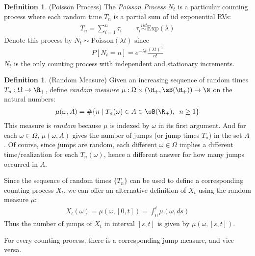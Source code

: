 \documentclass[12pt]{article}
\theoremstyle{plain}
\theoremstyle{definition}
\newtheorem{defn}[thm]{Definition}
\theoremstyle{remark}
\newcommand{\ra}{\rightarrow}
\newcommand{\iid}{\overset{iid}{\sim}}
\newcommand{\sumin}{\sum^n_{i=1}}
\begin{document}
\begin{defn}(Poisson Process)
The \emph{Poisson Process} $N_t$ is a particular counting process where
each random time $T_n$ is a partial sum of iid exponential RVs:
\begin{align*}
  T_n = \sumin \tau_i
  \qquad
  \tau_i\iid \text{Exp}(\lambda)
\end{align*}
Denote this process by $N_t\sim\text{Poisson}(\lambda t)$ since
\begin{align*}
  P[N_t=n]
  =
  e^{-\lambda t}
  \frac{(\lambda t)^n}{n!}
\end{align*}
$N_t$ is the only counting process with independent and stationary
increments.
\end{defn}

\begin{defn}(Random Measure)
Given  an increasing sequence of random times $T_n:\Omega\ra\R_+$,
define \emph{random measure} $\mu:\Omega\times(\R_+,\sB(\R_+))\ra \N$ on
the natural numbers:
\begin{align*}
  \mu(\omega,A)
  =
  \#\{
    n
    \;|\;
    T_n(\omega)\in A\in\sB(\R_+),\;\; n\geq 1
  \}
\end{align*}
This measure is \emph{random} because $\mu$ is indexed by $\omega$ in
its first argument.
And for each $\omega\in\Omega$, $\mu(\omega,A)$ gives the number of
jumps (or jump times $T_n$) in the set $A$.
Of course, since jumps are random, each different $\omega\in\Omega$
implies a different time/realization for each $T_n(\omega)$, hence a
different answer for how many jumps occurred in $A$.

Since the sequence of random times $\{T_n\}$ can be used to define a
corresponding counting process $X_t$, we can offer an alternative
definition of $X_t$ using the random measure $\mu$:
\begin{align}
  X_t(\omega)
  =
  \mu(\omega,[0,t])
  =
  \int_0^t
  \mu(\omega,ds)
  \label{jumprelate}
\end{align}
Thus the number of jumps of $X_t$ in interval $[s,t]$ is given by
$\mu(\omega,[s,t])$.

For every counting process, there is a corresponding jump measure, and
vice versa.
\end{defn}
\end{document}

